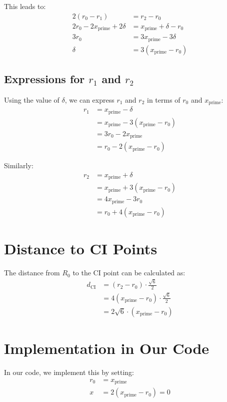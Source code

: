 \documentclass{article}
\begin{document}
This leads to:
\begin{align}
2(r_0 - r_1) &= r_2 - r_0 \\
2r_0 - 2x_{\text{prime}} + 2\delta &= x_{\text{prime}} + \delta - r_0 \\
3r_0 &= 3x_{\text{prime}} - 3\delta \\
\delta &= 3(x_{\text{prime}} - r_0)
\end{align}

\subsection{Expressions for $r_1$ and $r_2$}

Using the value of $\delta$, we can express $r_1$ and $r_2$ in terms of $r_0$ and $x_{\text{prime}}$:
\begin{align}
r_1 &= x_{\text{prime}} - \delta \\
&= x_{\text{prime}} - 3(x_{\text{prime}} - r_0) \\
&= 3r_0 - 2x_{\text{prime}} \\
&= r_0 - 2(x_{\text{prime}} - r_0)
\end{align}

Similarly:
\begin{align}
r_2 &= x_{\text{prime}} + \delta \\
&= x_{\text{prime}} + 3(x_{\text{prime}} - r_0) \\
&= 4x_{\text{prime}} - 3r_0 \\
&= r_0 + 4(x_{\text{prime}} - r_0)
\end{align}

\section{Distance to CI Points}

The distance from $R_0$ to the CI point can be calculated as:
\begin{align}
d_{\text{CI}} &= (r_2 - r_0) \cdot \frac{\sqrt{6}}{2} \\
&= 4(x_{\text{prime}} - r_0) \cdot \frac{\sqrt{6}}{2} \\
&= 2\sqrt{6} \cdot (x_{\text{prime}} - r_0)
\end{align}

\section{Implementation in Our Code}

In our code, we implement this by setting:
\begin{align}
r_0 &= x_{\text{prime}} \\
x &= 2(x_{\text{prime}} - r_0) = 0
\end{align}
\end{document}

